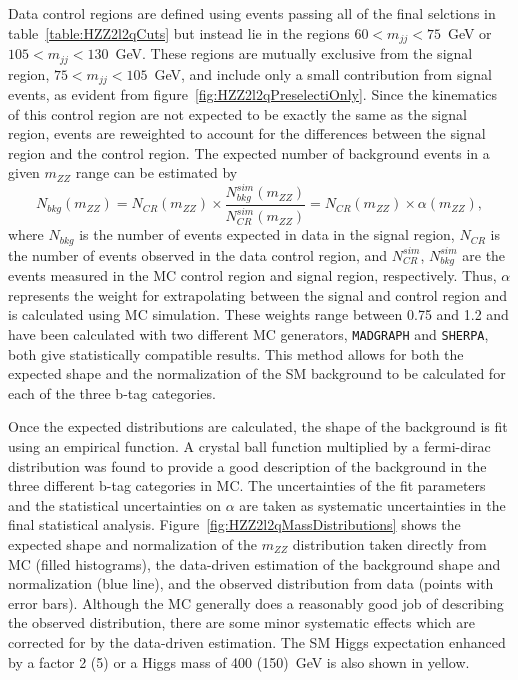 Data control regions are defined using events passing all
of the final selctions in table~\ref{table:HZZ2l2qCuts} but instead
lie in the regions $60 < m_{jj} < 75$~GeV or $105 < m_{jj} < 130$~GeV. 
These regions are mutually exclusive from the signal region, 
$75<m_{jj}<105$~GeV, and include
only a small contribution from signal events, as evident from 
figure~\ref{fig:HZZ2l2qPreselectiOnly}.  Since the kinematics of
this control region are not expected to be exactly the same as 
the signal 
region, events are reweighted to account for the 
differences between the signal region and the control region. 
The expected number
of background events in a given $m_{ZZ}$ range can be estimated by
\begin{equation}
N_{bkg}(m_{ZZ}) = N_{CR}(m_{ZZ})\times\frac{N_{bkg}^{sim}(m_{ZZ})}{N_{CR}^{sim}(m_{ZZ})}=N_{CR}(m_{ZZ})\times\alpha(m_{ZZ}),
\label{eq:HZZ2l2qAlpha}
\end{equation}
where $N_{bkg}$ is the number of events expected in data in the 
signal region, $N_{CR}$ is the number of events observed in the
data control region, and $N_{CR}^{sim}$, $N_{bkg}^{sim}$ are the 
events measured in the MC control region and signal region, 
respectively.  Thus, $\alpha$ represents the weight for extrapolating
between the signal and control region and is calculated using
MC simulation.
These weights range between 0.75 and 1.2 and have been calculated
with two different MC generators, {\verb+MADGRAPH+} and {\verb+SHERPA+}, 
both give statistically compatible results.  This method allows
for both the expected shape and the normalization of the SM
background to be calculated for each of the three b-tag categories.

Once the expected distributions are calculated, the shape of the
background is fit using an empirical
function.  A crystal ball function multiplied by a fermi-dirac
distribution was found to provide a good description of the 
background in the three different b-tag categories in MC.
The uncertainties of the fit parameters and the statistical 
uncertainties on $\alpha$ are taken as systematic
uncertainties in the final statistical analysis.  
Figure~\ref{fig:HZZ2l2qMassDistributions} shows the expected 
shape and normalization of the $m_{ZZ}$ distribution
taken directly from MC (filled histograms), 
the data-driven estimation of the background shape and normalization
(blue line), and the observed distribution from data (points with 
error bars). Although
the MC generally does a reasonably good job of describing the 
observed distribution, there are some minor systematic effects which 
are corrected for by the data-driven estimation.  The SM Higgs
expectation enhanced by a factor 2 (5) or a Higgs mass of 400 (150)~GeV 
is also shown in yellow.  

